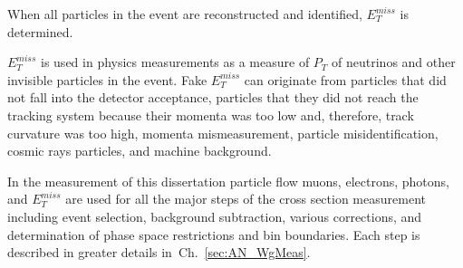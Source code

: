 When all particles in the event are reconstructed and identified, $E_T^{miss}$ is determined. 


$E_T^{miss}$ is used in physics measurements as a measure of $P_T$ of neutrinos and other invisible particles in the event. Fake $E_T^{miss}$ can originate from particles that did not fall into the detector acceptance, particles that they did not reach the tracking system because their momenta was too low and, therefore, track curvature was too high, momenta mismeasurement, particle misidentification, cosmic rays particles, and machine background.

In the measurement of this dissertation particle flow muons, electrons, photons, and $E_T^{miss}$ are used for all the major steps of the cross section measurement including event selection, background subtraction, various corrections, and determination of phase space restrictions and bin boundaries. Each step is described in greater details in~Ch.~\ref{sec:AN_WgMeas}. 

